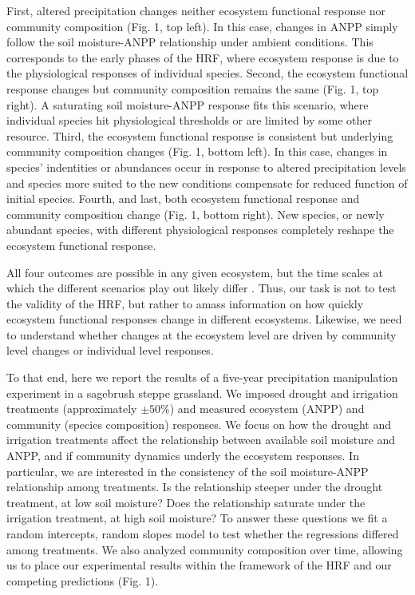 \documentclass[fleqn,10pt,lineno]{wlpeerj} %
\begin{document}
First, altered precipitation changes neither ecosystem functional
response nor community composition (Fig. 1, top left). In this case,
changes in ANPP simply follow the soil moisture-ANPP relationship under
ambient conditions. This corresponds to the early phases of the HRF,
where ecosystem response is due to the physiological responses of
individual species. Second, the ecosystem functional response changes
but community composition remains the same (Fig. 1, top right). A
saturating soil moisture-ANPP response fits this scenario, where
individual species hit physiological thresholds or are limited by some
other resource. Third, the ecosystem functional response is consistent
but underlying community composition changes (Fig. 1, bottom left). In
this case, changes in species' indentities or abundances occur in
response to altered precipitation levels and species more suited to the
new conditions compensate for reduced function of initial species.
Fourth, and last, both ecosystem functional response and community
composition change (Fig. 1, bottom right). New species, or newly
abundant species, with different physiological responses completely
reshape the ecosystem functional response.

All four outcomes are possible in any given ecosystem, but the time
scales at which the different scenarios play out likely differ
\citep{Smith2009, Wilcox2016, Knapp2017}. Thus, our task is not to test
the validity of the HRF, but rather to amass information on how quickly
ecosystem functional responses change in different ecosystems. Likewise,
we need to understand whether changes at the ecosystem level are driven
by community level changes or individual level responses.

To that end, here we report the results of a five-year precipitation
manipulation experiment in a sagebrush steppe grassland. We imposed
drought and irrigation treatments (approximately \(\pm50\%\)) and
measured ecosystem (ANPP) and community (species composition) responses.
We focus on how the drought and irrigation treatments affect the
relationship between available soil moisture and ANPP, and if community
dynamics underly the ecosystem responses. In particular, we are
interested in the consistency of the soil moisture-ANPP relationship
among treatments. Is the relationship steeper under the drought
treatment, at low soil moisture? Does the relationship saturate under
the irrigation treatment, at high soil moisture? To answer these
questions we fit a random intercepts, random slopes model to test
whether the regressions differed among treatments. We also analyzed
community composition over time, allowing us to place our experimental
results within the framework of the HRF and our competing predictions
(Fig. 1).
\end{document}
